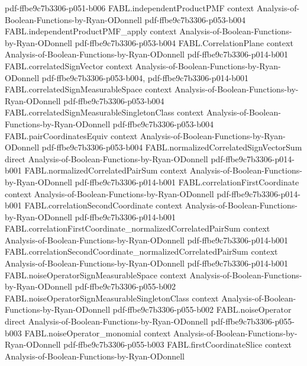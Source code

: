 \begin{theorem}
  {pdf-ffbe9c7b3306-p051-b006}
\proofstep
  {FABL.independentProductPMF}
  {context}
  {Analysis-of-Boolean-Functions-by-Ryan-ODonnell}
  {pdf-ffbe9c7b3306-p053-b004}
\proofstep
  {FABL.independentProductPMF_apply}
  {context}
  {Analysis-of-Boolean-Functions-by-Ryan-ODonnell}
  {pdf-ffbe9c7b3306-p053-b004}
\proofstep
  {FABL.CorrelationPlane}
  {context}
  {Analysis-of-Boolean-Functions-by-Ryan-ODonnell}
  {pdf-ffbe9c7b3306-p014-b001}
\proofstep
  {FABL.correlatedSignVector}
  {context}
  {Analysis-of-Boolean-Functions-by-Ryan-ODonnell}
  {pdf-ffbe9c7b3306-p053-b004,
    pdf-ffbe9c7b3306-p014-b001}
\proofstep
  {FABL.correlatedSignMeasurableSpace}
  {context}
  {Analysis-of-Boolean-Functions-by-Ryan-ODonnell}
  {pdf-ffbe9c7b3306-p053-b004}
\proofstep
  {FABL.correlatedSignMeasurableSingletonClass}
  {context}
  {Analysis-of-Boolean-Functions-by-Ryan-ODonnell}
  {pdf-ffbe9c7b3306-p053-b004}
\proofstep
  {FABL.pairCoordinatesEquiv}
  {context}
  {Analysis-of-Boolean-Functions-by-Ryan-ODonnell}
  {pdf-ffbe9c7b3306-p053-b004}
\proofstep
  {FABL.normalizedCorrelatedSignVectorSum}
  {direct}
  {Analysis-of-Boolean-Functions-by-Ryan-ODonnell}
  {pdf-ffbe9c7b3306-p014-b001}
\proofstep
  {FABL.normalizedCorrelatedPairSum}
  {context}
  {Analysis-of-Boolean-Functions-by-Ryan-ODonnell}
  {pdf-ffbe9c7b3306-p014-b001}
\proofstep
  {FABL.correlationFirstCoordinate}
  {context}
  {Analysis-of-Boolean-Functions-by-Ryan-ODonnell}
  {pdf-ffbe9c7b3306-p014-b001}
\proofstep
  {FABL.correlationSecondCoordinate}
  {context}
  {Analysis-of-Boolean-Functions-by-Ryan-ODonnell}
  {pdf-ffbe9c7b3306-p014-b001}
\proofstep
  {FABL.correlationFirstCoordinate_normalizedCorrelatedPairSum}
  {context}
  {Analysis-of-Boolean-Functions-by-Ryan-ODonnell}
  {pdf-ffbe9c7b3306-p014-b001}
\proofstep
  {FABL.correlationSecondCoordinate_normalizedCorrelatedPairSum}
  {context}
  {Analysis-of-Boolean-Functions-by-Ryan-ODonnell}
  {pdf-ffbe9c7b3306-p014-b001}
\proofstep
  {FABL.noiseOperatorSignMeasurableSpace}
  {context}
  {Analysis-of-Boolean-Functions-by-Ryan-ODonnell}
  {pdf-ffbe9c7b3306-p055-b002}
\proofstep
  {FABL.noiseOperatorSignMeasurableSingletonClass}
  {context}
  {Analysis-of-Boolean-Functions-by-Ryan-ODonnell}
  {pdf-ffbe9c7b3306-p055-b002}
\proofstep
  {FABL.noiseOperator}
  {direct}
  {Analysis-of-Boolean-Functions-by-Ryan-ODonnell}
  {pdf-ffbe9c7b3306-p055-b003}
\proofstep
  {FABL.noiseOperator_monomial}
  {context}
  {Analysis-of-Boolean-Functions-by-Ryan-ODonnell}
  {pdf-ffbe9c7b3306-p055-b003}
\proofstep
  {FABL.firstCoordinateSlice}
  {context}
  {Analysis-of-Boolean-Functions-by-Ryan-ODonnell}

\end{theorem}
